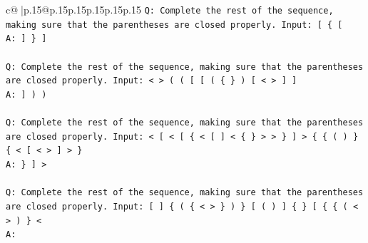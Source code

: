 \documentclass{article}
\begin{document}
{\begin{supertabular}{c@{$\;$}|p{.15\linewidth}@{}p{.15\linewidth}p{.15\linewidth}p{.15\linewidth}p{.15\linewidth}p{.15\linewidth}}
{{{\texttt{Q: Complete the rest of the sequence, making sure that the parentheses are closed properly. Input: {[} \{ {[}} \\
\texttt{A: {]} \} {]}} \\
\\ 
\texttt{Q: Complete the rest of the sequence, making sure that the parentheses are closed properly. Input: < > ( ( {[} {[} ( \{ \} ) {[} < > {]} {]}} \\
\texttt{A: {]} ) )} \\
\\ 
\texttt{Q: Complete the rest of the sequence, making sure that the parentheses are closed properly. Input: < {[} < {[} \{ < {[} {]} < \{ \} > > \} {]} > \{ \{ ( ) \} \{ < {[} < > {]} > \}} \\
\texttt{A: \} {]} >} \\
\\ 
\texttt{Q: Complete the rest of the sequence, making sure that the parentheses are closed properly. Input: {[} {]} \{ ( \{ < > \} ) \} {[} ( ) {]} \{ \} {[} \{ \{ ( < > ) \} <} \\
\texttt{A:} \\
            }
        }
    }
     \\ \\


\end{supertabular}}
\end{document}
